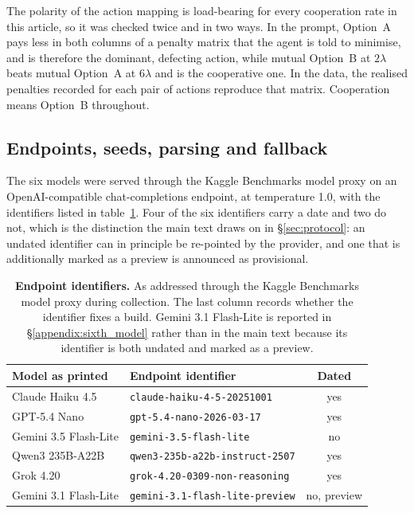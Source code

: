 \documentclass[openacc]{rsproca_new}
\newcommand{\lam}{\lambda}
\begin{document}
The polarity of the action mapping is load-bearing for every cooperation rate
in this article, so it was checked twice and in two ways. In the prompt,
Option~A pays less in both columns of a penalty matrix that the agent is told
to minimise, and is therefore the dominant, defecting action, while mutual
Option~B at $2\lam$ beats mutual Option~A at $6\lam$ and is the cooperative
one. In the data, the realised penalties recorded for each pair of actions
reproduce that matrix. Cooperation means Option~B throughout.

\subsection{Endpoints, seeds, parsing and fallback}\label{appendix:endpoints}

The six models were served through the Kaggle Benchmarks model proxy on an
OpenAI-compatible chat-completions endpoint, at temperature 1.0, with the
identifiers listed in table~\ref{tab:A-endpoints}. Four of the six identifiers
carry a date and two do not, which is the distinction the main text draws on in
\S\ref{sec:protocol}: an undated identifier can in principle be re-pointed by
the provider, and one that is additionally marked as a preview is announced as
provisional.

\begin{table}[htbp]
\centering
\footnotesize
\caption{\textbf{Endpoint identifiers.} As addressed through the Kaggle
Benchmarks model proxy during collection. The last column records whether the
identifier fixes a build. Gemini 3.1 Flash-Lite is reported in
\S\ref{appendix:sixth_model} rather than in the main text because its
identifier is both undated and marked as a preview.}
\label{tab:A-endpoints}
\begin{tabular}{@{}llc@{}}
\toprule
Model as printed & Endpoint identifier & Dated \\
\midrule
Claude Haiku 4.5      & \texttt{claude-haiku-4-5-20251001}      & yes \\
GPT-5.4 Nano          & \texttt{gpt-5.4-nano-2026-03-17}        & yes \\
Gemini 3.5 Flash-Lite & \texttt{gemini-3.5-flash-lite}          & no  \\
Qwen3 235B-A22B       & \texttt{qwen3-235b-a22b-instruct-2507}  & yes \\
Grok 4.20             & \texttt{grok-4.20-0309-non-reasoning}   & yes \\
Gemini 3.1 Flash-Lite & \texttt{gemini-3.1-flash-lite-preview}  & no, preview \\
\bottomrule
\end{tabular}
\end{table}
\end{document}
